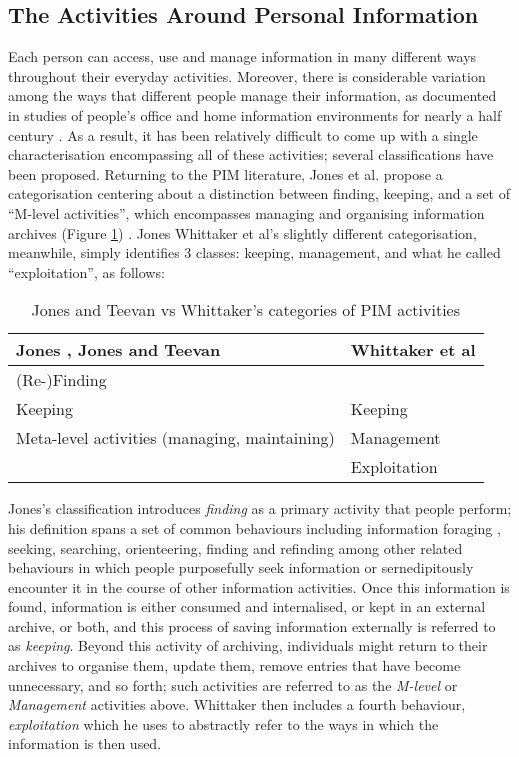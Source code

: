 \documentclass[runningheads,a4paper]{llncs}
\begin{document}
\subsection{The Activities Around Personal Information}

Each person can access, use and manage information in many different ways throughout their everyday activities.  Moreover, there is considerable variation among the ways that different people manage their information, as documented in studies of people's office and home information environments for nearly a half century \cite{filerspilers}.  As a result, it has been relatively difficult to come up with a single characterisation encompassing all of these activities; several classifications have been proposed.  Returning to the PIM literature, Jones et al. propose a categorisation centering about a distinction between finding, keeping, and a set of ``M-level activities'', which encompasses managing and organising information archives (Figure \ref{fig:pimactivities}) \cite{kftf}. Jones Whittaker et al's slightly different categorisation, meanwhile, simply identifies 3 classes: keeping, management, and what he called ``exploitation'', as follows:

\begin{table}
\begin{center}
\begin{tabular}{p{4.5cm} | p{4.5cm}} 
Jones \cite{jones}, Jones and Teevan \cite{jonesteevan}& Whittaker et al \cite{whittaker}\\
\hline
(Re-)Finding &  \\
Keeping & Keeping \\
Meta-level activities (managing, maintaining) & Management \\
 & Exploitation \\
\end{tabular}
\caption{Jones and Teevan vs Whittaker's categories of PIM activities}
\label{fig:pimactivities}
\end{center}
\end{table}

Jones's classification introduces \emph{finding} as a primary activity that people perform; his definition spans a set of common behaviours including information foraging \cite{}, seeking\cite{}, searching\cite{}, orienteering\cite{}, finding and refinding \cite{} among other related behaviours in which people purposefully seek information or sernedipitously encounter it in the course of other information activities.  Once this information is found, information is either consumed and internalised, or kept in an external archive, or both, and this process of saving information externally is referred to as \emph{keeping}.  Beyond this activity of archiving, individuals might return to their archives to organise them, update them, remove entries that have become unnecessary, and so forth; such activities are referred to as the \emph{M-level} or \emph{Management} activities above.   Whittaker then includes a fourth behaviour, \emph{exploitation} which he uses to abstractly refer to the ways in which the information is then used.
\end{document}

